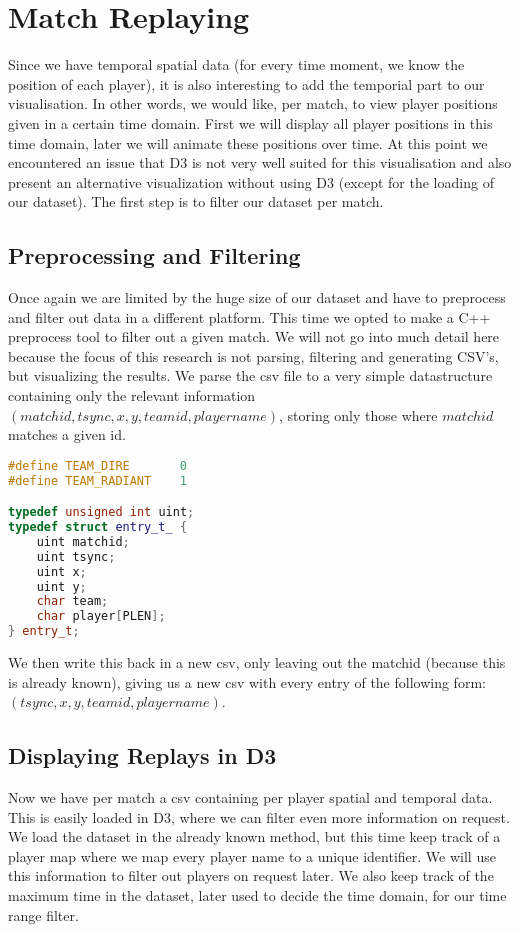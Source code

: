 \section{Match Replaying}
Since we have temporal spatial data (for every time moment, we know the position of each player), it is also interesting to add the temporial part to our visualisation. In other words, we would like, per match, to view player positions given in a certain time domain. First we will display all player positions in this time domain, later we will animate these positions over time. At this point we encountered an issue that D3 is not very well suited for this visualisation and also present an alternative visualization without using D3 (except for the loading of our dataset). The first step is to filter our dataset per match.

\subsection{Preprocessing and Filtering}
Once again we are limited by the huge size of our dataset and have to preprocess and filter out data in a different platform. This time we opted to make a C++ preprocess tool to filter out a given match. We will not go into much detail here because the focus of this research is not parsing, filtering and generating CSV's, but visualizing the results. We parse the csv file to a very simple datastructure containing only the relevant information $(matchid, tsync, x, y, teamid, playername)$, storing only those where $matchid$ matches a given id.

\begin{lstlisting}[language=C++]
#define TEAM_DIRE		0
#define TEAM_RADIANT	1

typedef unsigned int uint;
typedef struct entry_t_ {
	uint matchid;
	uint tsync;
	uint x;
	uint y;
	char team;
	char player[PLEN];
} entry_t;
\end{lstlisting}

We then write this back in a new csv, only leaving out the matchid (because this is already known), giving us a new csv with every entry of the following form: $(tsync, x, y, teamid, playername)$.

\subsection{Displaying Replays in D3}
Now we have per match a csv containing per player spatial and temporal data. This is easily loaded in D3, where we can filter even more information on request. We load the dataset in the already known method, but this time keep track of a player map where we map every player name to a unique identifier. We will use this information to filter out players on request later. We also keep track of the maximum time in the dataset, later used to decide the time domain, for our time range filter.

